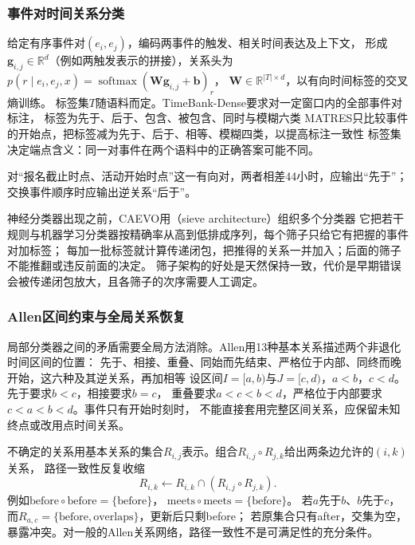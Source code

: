 \subsubsection{事件对时间关系分类}
\label{sec:nlp-extraction-temporal-classifier}

给定有序事件对$(e_i,e_j)$，编码两事件的触发、相关时间表达及上下文，
形成$\bm{g}_{i,j}\in\mathbb{R}^{d}$（例如两触发表示的拼接），关系头为
$p(r\mid e_i,e_j,x)=\operatorname{softmax}(\bm{W}\bm{g}_{i,j}+\bm{b})_r$，
$\bm{W}\in\mathbb{R}^{|T|\times d}$，以有向时间标签的交叉熵训练。
标签集$T$随语料而定。TimeBank-Dense要求对一定窗口内的全部事件对标注，
标签为先于、后于、包含、被包含、同时与模糊六类
MATRES只比较事件的开始点，把标签减为先于、后于、相等、模糊四类，以提高标注一致性
标签集决定端点含义：同一对事件在两个语料中的正确答案可能不同。

对“报名截止时点、活动开始时点”这一有向对，两者相差44小时，应输出“先于”；
交换事件顺序时应输出逆关系“后于”。

神经分类器出现之前，CAEVO用（sieve architecture）组织多个分类器
它把若干规则与机器学习分类器按精确率从高到低排成序列，每个筛子只给它有把握的事件对加标签；
每加一批标签就计算传递闭包，把推得的关系一并加入；后面的筛子不能推翻或违反前面的决定。
筛子架构的好处是天然保持一致，代价是早期错误会被传递闭包放大，且各筛子的次序需要人工调定。

\subsubsection{Allen区间约束与全局关系恢复}
\label{sec:nlp-extraction-allen}

局部分类器之间的矛盾需要全局方法消除。Allen用13种基本关系描述两个非退化时间区间的位置：
先于、相接、重叠、同始而先结束、严格位于内部、同终而晚开始，这六种及其逆关系，再加相等
设区间$I=[a,b)$与$J=[c,d)$，$a<b$，$c<d$。先于要求$b<c$，相接要求$b=c$，
重叠要求$a<c<b<d$，严格位于内部要求$c<a<b<d$。事件只有开始时刻时，
不能直接套用完整区间关系，应保留未知终点或改用点时间关系。

不确定的关系用基本关系的集合$R_{i,j}$表示。组合$R_{i,j}\circ R_{j,k}$给出两条边允许的$(i,k)$关系，
路径一致性反复收缩
\begin{equation}
  R_{i,k}\leftarrow R_{i,k}\cap
      (R_{i,j}\circ R_{j,k}).
  \label{eq:nlp-extraction-allen-propagation}
\end{equation}
例如$\mathrm{before}\circ\mathrm{before}=\{\mathrm{before}\}$，
$\mathrm{meets}\circ\mathrm{meets}=\{\mathrm{before}\}$。
若$a$先于$b$、$b$先于$c$，而$R_{a,c}=\{\mathrm{before},\mathrm{overlaps}\}$，更新后只剩before；
若原集合只有after，交集为空，暴露冲突。对一般的Allen关系网络，路径一致性不是可满足性的充分条件。


